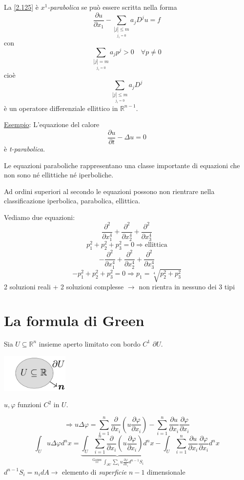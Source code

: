 \documentclass[a4paper,11pt]{report}
\newcommand{\R}{\mathbb{R}}
\newcommand{\Rn}{\mathbb{R}^n}
\begin{document}
La \eqref{2.125} \`e \emph{$x^1$-parabolica} se pu\`o essere scritta nella forma
\begin{equation}
\frac{\partial u}{\partial x_1} - \sum_{\underset{j_1=0}{|j|\leq m}}a_jD^j u=f 
\label{2.131}
\end{equation}
con
\[
\sum_{\underset{j_1=0}{|j| = m}} a_jp^j >0 \quad \forall p\neq 0
\]
cio\`e
\[
\sum_{\underset{j_1=0}{|j|\leq m}} a_jD^j
\]
\`e un operatore differenziale ellittico in $\R^{n-1}$.

\medskip

\underline{Esempio}: L'equazione del calore
\[
\frac{\partial u}{\partial t} - \Delta u=0
\]
\`e \emph{t-parabolica}.

Le equazioni paraboliche rappresentano una classe importante di equazioni che non sono n\'e ellittiche n\'e iperboliche.

Ad ordini superiori al secondo le equazioni possono non rientrare nella classificazione iperbolica, parabolica, ellittica.

Vediamo due equazioni:
\[
\frac{\partial^2}{\partial x_1^4}+\frac{\partial^2}{\partial x_2^4}+\frac{\partial^2}{\partial x_3^4}
\]
\[
p_1^2+p_2^2+p_3^2=0 \Rightarrow \text{ellittica}
\]
\[
-\frac{\partial^2}{\partial x_1^4}+\frac{\partial^2}{\partial x_2^4}+\frac{\partial^2}{\partial x_3^4}
\]
\[
-p_1^2+p_2^2+p_3^2=0 \Rightarrow p_1=\sqrt[4]{p_2^2+p_3^2}
\]
2 soluzioni reali + 2 soluzioni complesse $\rightarrow$ non rientra in nessuno dei 3 tipi

\section{La formula di Green} %

Sia $U\subseteq \Rn$ insieme aperto limitato con bordo $C^1$ $\partial U$.
\begin{center}
\includegraphics[width=0.25\textwidth]{immagini/insiemeu}
\end{center}
$u,\varphi$ funzioni $C^2$ in $U$.

\[
\Rightarrow u\Delta \varphi = \sum_{i=1}^n\frac{\partial}{\partial x_i}\left(u\frac{\partial \varphi}{\partial x_i} \right) - \sum_{i=1}^{n}\frac{\partial u}{\partial x_i}\frac{\partial \varphi}{\partial x_i}
\]
\[
\int_{U}u\Delta \varphi d^n x=\underbrace{\int_{U}\sum_{i=1}^n\frac{\partial}{\partial x_i}\left(u\frac{\partial \varphi}{\partial x_i} \right)d^n x}_{ \overset{\text{Gauss}}{=}\int_{\partial U}\sum_i u\frac{\partial \varphi}{\partial x_i}d^{n-1}S_i} - \int_{U} \sum_{i=1}^{n} \frac{\partial u}{\partial x_i}\frac{\partial \varphi}{\partial x_i}d^n x
\]
$d^{n-1}S_i=n_i dA \rightarrow$ elemento di \emph{superficie} $n-1$ dimensionale
\end{document}
